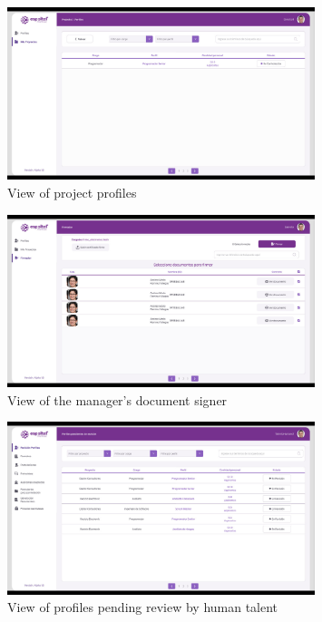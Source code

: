 \documentclass{scrreprt}
\begin{document}
\begin{figure}[H]
	\centering \small
	\includegraphics[width=0.8\textwidth]{WebPrototype/wflow-20.jpeg}
	\caption{View of project profiles}
\end{figure}


\begin{figure}[H]
	\centering \small
	\includegraphics[width=0.8\textwidth]{WebPrototype/wflow-21.jpeg}
	\caption{View of the manager's document signer}
\end{figure}

\begin{figure}[H]
	\centering \small
	\includegraphics[width=0.8\textwidth]{WebPrototype/wflow-22.jpeg}
	\caption{View of profiles pending review by human talent}
\end{figure}
\end{document}
